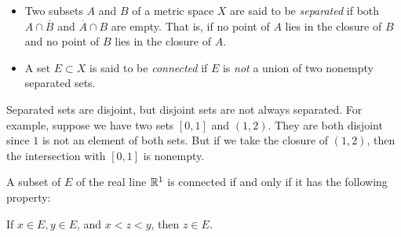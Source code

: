 \documentclass[11pt,a4paper]{book}
\begin{document}
\begin{definition}[Separated]
    \begin{itemize}
    \item Two subsets \( A  \) and \( B  \) of a metric space \( X  \) are said to be \textit{separated} if both \( A \cap \overline{B} \) and \( \overline{A} \cap B  \) are empty. That is, if no point of \( A  \) lies in the closure of \( B  \) and no point of \( B \) lies in the closure of \( A  \). 
    \item A set \( E \subset X  \) is said to be \textit{connected} if \( E  \) is \textit{not} a union of two nonempty separated sets. 
    \end{itemize}
\end{definition}

\begin{remark}
    Separated sets are disjoint, but disjoint sets are not always separated. For example, suppose we have two sets \( [0,1] \) and \( (1,2) \). They are both disjoint since \( 1  \) is not an element of both sets. But if we take the closure of \( (1,2) \), then the intersection with \( [0,1] \) is nonempty. 
\end{remark}

\begin{theorem}[ ]
    A subset of \( E  \) of the real line \( \mathbb{R}^{1} \) is connected if and only if it has the following property:  
    \begin{center}
        If \( x \in E, y \in E  \), and \( x < z < y  \), then \( z \in E  \).
    \end{center}
\end{theorem}
\end{document}
